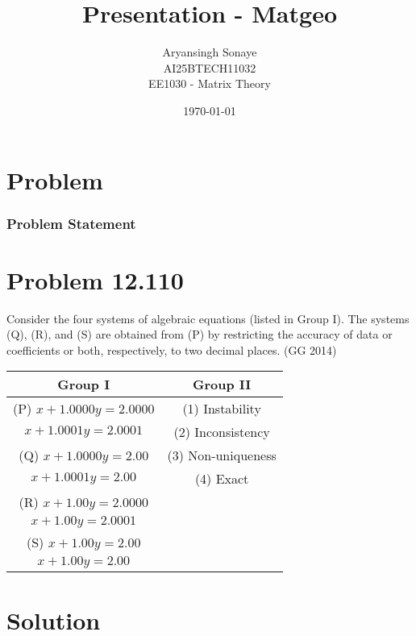 \documentclass{beamer}
\title{Presentation - Matgeo}
\author{Aryansingh Sonaye \\
AI25BTECH11032 \\
EE1030 - Matrix Theory}
\date{\today}
\theoremstyle{remark}
\numberwithin{equation}{section}
\begin{document}
\begin{frame}
\titlepage
\end{frame}

\section{Problem}
\begin{frame}
\frametitle{Problem Statement}
\section*{Problem 12.110}

Consider the four systems of algebraic equations (listed in Group I). 
The systems (Q), (R), and (S) are obtained from (P) by restricting the accuracy 
of data or coefficients or both, respectively, to two decimal places. (GG 2014)

\begin{table}[H]
\centering
\begin{tabular}{|c|c|}
\hline
\textbf{Group I} & \textbf{Group II} \\
\hline
(P)\; $x+1.0000y=2.0000$ & (1)\; Instability \\
\;\;\;\;\; $x+1.0001y=2.0001$ & (2)\; Inconsistency \\
(Q)\; $x+1.0000y=2.00$ & (3)\; Non-uniqueness \\
\;\;\;\;\; $x+1.0001y=2.00$ & (4)\; Exact \\
(R)\; $x+1.00y=2.0000$ & \\
\;\;\;\;\; $x+1.00y=2.0001$ & \\
(S)\; $x+1.00y=2.00$ & \\
\;\;\;\;\; $x+1.00y=2.00$ & \\
\hline
\end{tabular}
\end{table}


\end{frame}

\section{Solution}
\end{document}
